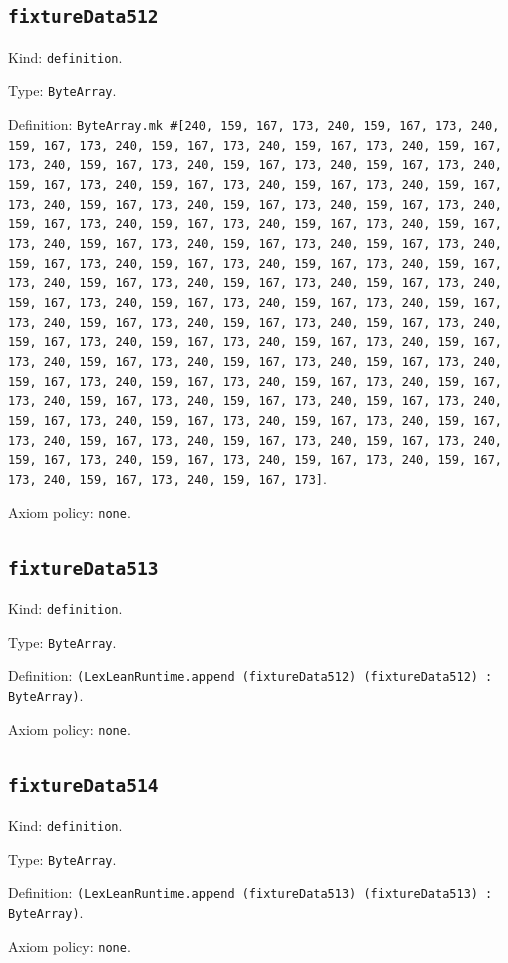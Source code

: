 \documentclass[11pt]{article}
\begin{document}
\subsection*{\texttt{fixtureData512}}
\noindent Kind: \texttt{definition}.\par
\noindent Type: \texttt{ByteArray}.\par
\noindent Definition: \texttt{ByteArray.mk \#[240, 159, 167, 173, 240, 159, 167, 173, 240, 159, 167, 173, 240, 159, 167, 173, 240, 159, 167, 173, 240, 159, 167, 173, 240, 159, 167, 173, 240, 159, 167, 173, 240, 159, 167, 173, 240, 159, 167, 173, 240, 159, 167, 173, 240, 159, 167, 173, 240, 159, 167, 173, 240, 159, 167, 173, 240, 159, 167, 173, 240, 159, 167, 173, 240, 159, 167, 173, 240, 159, 167, 173, 240, 159, 167, 173, 240, 159, 167, 173, 240, 159, 167, 173, 240, 159, 167, 173, 240, 159, 167, 173, 240, 159, 167, 173, 240, 159, 167, 173, 240, 159, 167, 173, 240, 159, 167, 173, 240, 159, 167, 173, 240, 159, 167, 173, 240, 159, 167, 173, 240, 159, 167, 173, 240, 159, 167, 173, 240, 159, 167, 173, 240, 159, 167, 173, 240, 159, 167, 173, 240, 159, 167, 173, 240, 159, 167, 173, 240, 159, 167, 173, 240, 159, 167, 173, 240, 159, 167, 173, 240, 159, 167, 173, 240, 159, 167, 173, 240, 159, 167, 173, 240, 159, 167, 173, 240, 159, 167, 173, 240, 159, 167, 173, 240, 159, 167, 173, 240, 159, 167, 173, 240, 159, 167, 173, 240, 159, 167, 173, 240, 159, 167, 173, 240, 159, 167, 173, 240, 159, 167, 173, 240, 159, 167, 173, 240, 159, 167, 173, 240, 159, 167, 173, 240, 159, 167, 173, 240, 159, 167, 173, 240, 159, 167, 173, 240, 159, 167, 173, 240, 159, 167, 173, 240, 159, 167, 173, 240, 159, 167, 173, 240, 159, 167, 173]}.\par
\noindent Axiom policy: \texttt{none}.\par
\subsection*{\texttt{fixtureData513}}
\noindent Kind: \texttt{definition}.\par
\noindent Type: \texttt{ByteArray}.\par
\noindent Definition: \texttt{(LexLeanRuntime.append (fixtureData512) (fixtureData512) : ByteArray)}.\par
\noindent Axiom policy: \texttt{none}.\par
\subsection*{\texttt{fixtureData514}}
\noindent Kind: \texttt{definition}.\par
\noindent Type: \texttt{ByteArray}.\par
\noindent Definition: \texttt{(LexLeanRuntime.append (fixtureData513) (fixtureData513) : ByteArray)}.\par
\noindent Axiom policy: \texttt{none}.\par
\end{document}
